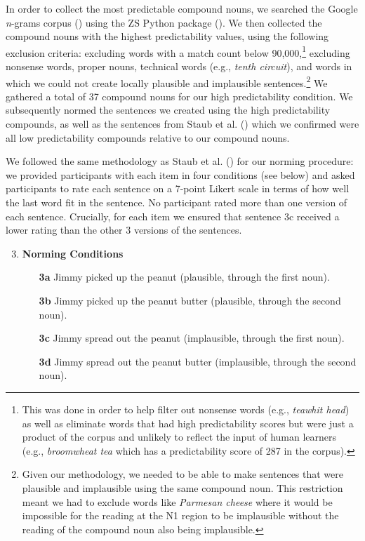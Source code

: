 \documentclass[
  12pt,
  letterpaper,
]{scrreprt}
\begin{document}
In order to collect the most predictable compound nouns, we searched the
Google \emph{n}-grams corpus
() using the ZS Python package
(). We then collected
the compound nouns with the highest predictability values, using the
following exclusion criteria: excluding words with a match count below
90,000,\footnote{This was done in order to help filter out nonsense
  words (e.g., \emph{teawhit head}) as well as eliminate words that had
  high predictability scores but were just a product of the corpus and
  unlikely to reflect the input of human learners (e.g.,
  \emph{broomwheat tea} which has a predictability score of 287 in the
  corpus).} excluding nonsense words, proper nouns, technical words
(e.g., \emph{tenth circuit}), and words in which we could not create
locally plausible and implausible sentences.\footnote{Given our
  methodology, we needed to be able to make sentences that were
  plausible and implausible using the same compound noun. This
  restriction meant we had to exclude words like \emph{Parmesan cheese}
  where it would be impossible for the reading at the N1 region to be
  implausible without the reading of the compound noun also being
  implausible.} We gathered a total of 37 compound nouns for our high
predictability condition. We subsequently normed the sentences we
created using the high predictability compounds, as well as the
sentences from Staub et al.
() which we
confirmed were all low predictability compounds relative to our compound
nouns.

We followed the same methodology as Staub et al.
() for our norming
procedure: we provided participants with each item in four conditions
(see below) and asked participants to rate each sentence on a 7-point
Likert scale in terms of how well the last word fit in the sentence. No
participant rated more than one version of each sentence. Crucially, for
each item we ensured that sentence 3c received a lower rating than the
other 3 versions of the sentences.

\begin{enumerate} \setcounter{enumi}{2}
   \item \textbf{Norming Conditions}
    \begin{enumerate}
        \item[\textbf{3a}] Jimmy picked up the peanut (plausible, through the first noun).
        \item[\textbf{3b}] Jimmy picked up the peanut butter (plausible, through the second noun).
        \item[\textbf{3c}] Jimmy spread out the peanut (implausible, through the first noun).
        \item[\textbf{3d}] Jimmy spread out the peanut butter (implausible, through the second noun).
    \end{enumerate} \label{figanext}
\end{enumerate}
\end{document}

